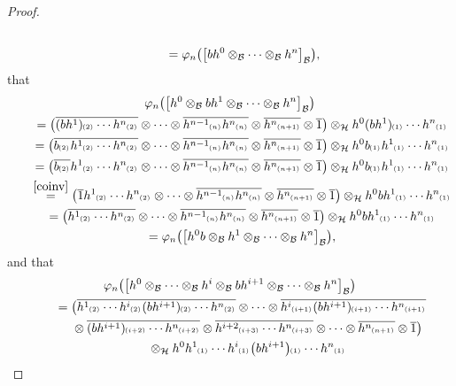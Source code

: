 \documentclass[pdftex]{sigma}
\numberwithin{equation}{section}
\newcommand{\ps}[1]{~\hspace{-4pt}_{^{(#1)}}}
\newcommand{\wbar}[1]{\overline{#1}}
\begin{document}
\begin{proof}
\begin{gather*}
\\
\qquad{}
=\varphi_n\big(\big[bh^0\otimes_{\cal B}\cdots\otimes_{\cal B} h^n\big]_{\cal B}\big),
\end{gather*}
that
\begin{gather*}
\varphi_n\big(\big[h^0\otimes_{\cal B} bh^{1}\otimes_{\cal B}\cdots\otimes_{\cal B} h^n\big]_{\cal B}\big)
\\
\qquad
=\big(\wbar{(bh^1)\ps{2}\cdots h^n\ps{2}} \otimes\cdots\otimes \wbar{h^{n-1}\ps{n}h^n\ps{n}} \otimes \wbar{h^n\ps{n+1}}
\otimes \wbar{1}\big) \otimes_{\cal H} h^0(bh^1)\ps{1}\cdots h^n\ps{1}
\\
\qquad
=\big(\wbar{b\ps{2}h^1\ps{2}\cdots h^n\ps{2}} \otimes\cdots\otimes \wbar{h^{n-1}\ps{n}h^n\ps{n}} \otimes
\wbar{h^n\ps{n+1}} \otimes \wbar{1}\big) \otimes_{\cal H} h^0b\ps{1}h^1\ps{1}\cdots h^n\ps{1}
\\
\qquad
=\big(\wbar{b\ps{2}}h^1\ps{2}\cdots h^n\ps{2} \otimes\cdots\otimes \wbar{h^{n-1}\ps{n}h^n\ps{n}} \otimes
\wbar{h^n\ps{n+1}} \otimes \wbar{1}\big) \otimes_{\cal H} h^0b\ps{1}h^1\ps{1}\cdots h^n\ps{1}
\\
\qquad
\stackrel{\eqref{coinv}}{=}
\big(\wbar{1}h^1\ps{2}\cdots h^n\ps{2} \otimes\cdots\otimes \wbar{h^{n-1}\ps{n}h^n\ps{n}} \otimes \wbar{h^n\ps{n+1}}
\otimes \wbar{1}\big) \otimes_{\cal H} h^0bh^1\ps{1}\cdots h^n\ps{1}
\\
\qquad
=\big(\wbar{h^1\ps{2}\cdots h^n\ps{2}} \otimes\cdots\otimes \wbar{h^{n-1}\ps{n}h^n\ps{n}} \otimes \wbar{h^n\ps{n+1}}
\otimes \wbar{1}\big) \otimes_{\cal H} h^0bh^1\ps{1}\cdots h^n\ps{1}
\\
\qquad
=\varphi_n\big(\big[h^0b\otimes_{\cal B} h^{1}\otimes_{\cal B}\cdots\otimes_{\cal B} h^n\big]_{\cal B}\big),
\end{gather*}
and that
\begin{gather*}
\varphi_n\big(\big[h^0\otimes_{\cal B}\cdots\otimes_{\cal B} h^i\otimes_{\cal B} bh^{i+1}\otimes_{\cal
B}\dots\otimes_{\cal B} h^n\big]_{\cal B}\big)
\\
\qquad
=\big(\wbar{h^1\ps{2}\cdots h^i\ps{2}(bh^{i+1})\ps{2}\cdots h^n\ps{2}}\otimes\dots\otimes
\wbar{h^i\ps{i+1}(bh^{i+1})\ps{i+1}\cdots h^n\ps{i+1}}
\\
\qquad\phantom{=}{}\otimes
\wbar{(bh^{i+1})\ps{i+2}\cdots h^n\ps{i+2}} \otimes \wbar{h^{i+2}\ps{i+3}\cdots
h^n\ps{i+3}}\otimes\cdots\otimes\wbar{h^n\ps{n+1}} \otimes \wbar{1}\big) \\
 \qquad\phantom{=}{}\otimes_{\cal H}
h^0h^1\ps{1}\cdots h^{i}\ps{1}\big(bh^{i+1}\big)\ps{1}\cdots h^n\ps{1}
\\

\end{gather*}
\end{proof}
\end{document}
